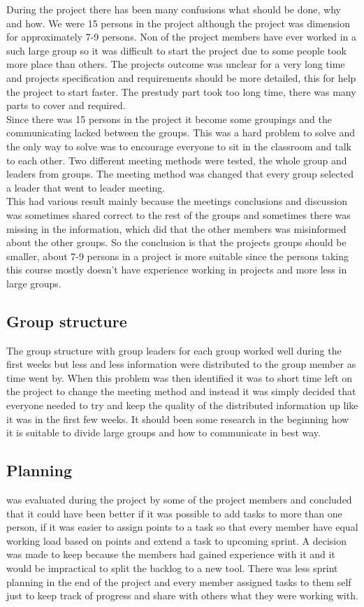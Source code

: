 
During the project there has been many confusions what should be done, why and how. We were 15 persons in the project although the project was dimension for approximately 7-9 persons. Non of the project members have ever worked in a such large group so it was difficult to start the project due to some people took more place than others. The projects outcome was unclear for a very long time and projects specification and requirements should be more detailed, this for help the project to start faster. The prestudy part took too long time, there was many parts to cover and required.
\\
Since there was 15 persons in the project it become some groupings and the communicating lacked between the groups. This was a hard problem to solve and the only way to solve was to encourage everyone to sit in the classroom and talk to each other. Two different meeting methods were tested, the whole group and leaders from groups. The meeting method was changed that every group selected a leader that went to leader meeting.\\
 This had various result mainly because the meetings conclusions and discussion was sometimes shared correct to the rest of the groups and sometimes there was missing in the information, which did that the other members was misinformed about the other groups. So the conclusion is that the projects groups should be smaller, about 7-9 persons in a project is more suitable since the persons taking this course mostly doesn't have experience working in projects and more less in large groups.

\subsection{Group structure}
The group structure with group leaders for each group worked well during the first weeks but less and less information were distributed to the group member as time went by. When this problem was then identified it was to short time left on the project to change the meeting method and instead it was simply decided that everyone needed to try and keep the quality of the distributed information up like it was in the first few weeks. It should been some research in the beginning how it is suitable to divide large groups and how to communicate in best way.  \\

\subsection{Planning}
\taiga{} was evaluated during the project by some of the project members and concluded that it could have been better if it was possible to add tasks to more than one person, if it was easier to assign points to a task so that every member have equal working load based on points and extend a task to upcoming sprint. A decision was made to keep \taiga{} because the members had gained experience with it and it would be impractical to split the backlog to a new tool. There was less sprint planning in the end of the project and every member assigned tasks to them self just to keep track of progress and share with others what they were working with.

